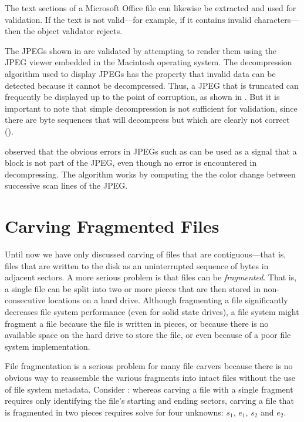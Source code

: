 \documentclass[11pt,letter]{article}
\begin{document}
The text sections of a Microsoft Office file can likewise be extracted
and used for validation. If the text is not valid---for example, if it
contains invalid characters---then the object validator rejects.


The JPEGs shown in  are validated by
attempting to render them using the JPEG viewer embedded in the
Macintosh operating system. The decompression algorithm used to
display JPEGs has the property that invalid data can be detected
because it cannot be decompressed. Thus, a JPEG that is truncated can
frequently be displayed up to the point of corruption, as shown in
. But it is important to note that simple
decompression is not sufficient for validation, since there are
byte sequences that will decompress but which are clearly not
correct ().

\cite{memon:sht} observed that the obvious errors in JPEGs such as
 can be used as a signal that a block is
not part of the JPEG, even though no error is encountered in
decompressing. The algorithm works by computing the the color change
between successive scan lines of the JPEG. 


\section{Carving Fragmented Files}

Until now we have only discussed carving of files that are
contiguous---that is, files that are written to the disk as an
uninterrupted sequence of bytes in adjacent sectors. A more serious
problem is that files can be \emph{fragmented}. That is, a single file
can be split into two or more pieces that are then stored in
non-consecutive locations on a hard drive. Although fragmenting a file
significantly decreases file system performance (even for solid state
drives), a file system might fragment a file because the file is
written in pieces, or because there is no available space on the hard
drive to store the file, or even because of a poor file system
implementation.

File fragmentation is a serious problem for many file carvers because
there is no obvious way to reassemble the various fragments into
intact files without the use of file system metadata. Consider
: whereas carving a file with a single
fragment requires only identifying the file's starting and ending
sectors, carving a file that is fragmented in two pieces requires solve for four
unknowns: $s_1$, $e_1$, $s_2$ and $e_2$. 
\end{document}
